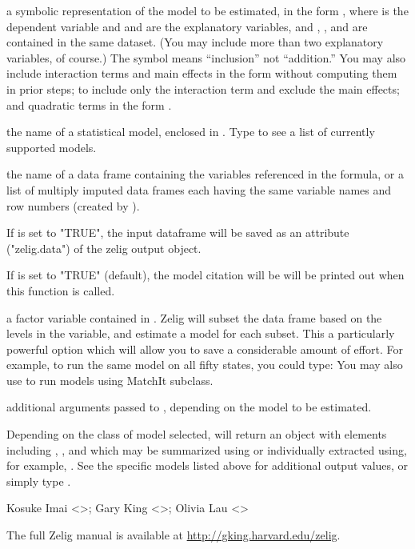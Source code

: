 \begin{Arguments}
\begin{ldescription}
\item[\code{formula}] a symbolic representation of the model to be
estimated, in the form , where  is the
dependent variable and  and  are the explanatory
variables, and , , and  are contained in the
same dataset.  (You may include more than two explanatory variables,
of course.)  The \code{+} symbol means ``inclusion'' not
``addition.''  You may also include interaction terms and main
effects in the form  without computing them in prior
steps;  to include only the interaction term and
exclude the main effects; and quadratic terms in the form
.  
\item[\code{model}] the name of a statistical model, enclosed in .
Type  to see a list of currently supported
models.  
\item[\code{data}] the name of a data frame containing the variables
referenced in the formula, or a list of multiply imputed data frames
each having the same variable names and row numbers (created by
). 
\item[\code{save.data}] If is set to "TRUE", the input dataframe will be saved
as an attribute ("zelig.data") of the zelig output object. 
\item[\code{cite}] If is set to "TRUE" (default), the model citation will be
will be printed out when this function is called. 
\item[\code{by}] a factor variable contained in .  Zelig will subset
the data frame based on the levels in the  variable, and
estimate a model for each subset.  This a particularly powerful option
which will allow you to save a considerable amount of effort.  For
example, to run the same model on all fifty states, you could type:
You may also use  to run models using MatchIt subclass.  
\item[\code{...}] additional arguments passed to ,
depending on the model to be estimated. 
\end{ldescription}
\end{Arguments}
\begin{Value}
Depending on the class of model selected,  will return
an object with elements including , ,
and  which may be summarized using
 or individually extracted using, for example,
.  See the specific models listed above
for additional output values, or simply type .
\end{Value}
\begin{Author}\relax
Kosuke Imai <>; Gary King
<>; Olivia Lau <>
\end{Author}
\begin{SeeAlso}\relax
The full Zelig manual is available at
\url{http://gking.harvard.edu/zelig}.
\end{SeeAlso}


